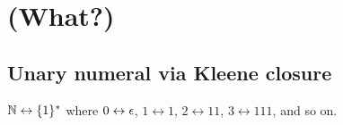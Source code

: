 \chapter{(What?)}

\section{Unary numeral via Kleene closure}

\(\mathbb{N} \leftrightarrow \{1\}^*\)
where \(0 \leftrightarrow \epsilon\), \(1 \leftrightarrow 1\), \(2 \leftrightarrow 11\), \(3 \leftrightarrow 111\), and so on.
